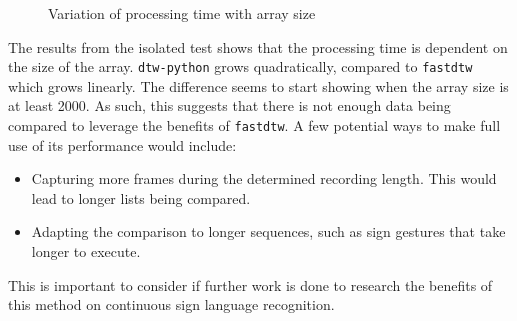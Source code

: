 \documentclass[final,rdr32.tex]{subfiles}
\begin{document}
\begin{figure}[H]
    \begin{center}
    \end{center}
    \caption{Variation of processing time with array size}
    \label{line:performance}
\end{figure}


The results from the isolated test shows that the processing time is dependent on the size of the array. \verb|dtw-python| grows quadratically, compared to \verb|fastdtw| which grows linearly. The difference seems to start showing when the array size is at least 2000. As such, this suggests that there is not enough data being compared to leverage the benefits of \verb|fastdtw|. A few potential ways to make full use of its performance would include:
\begin{itemize}
    \item Capturing more frames during the determined recording length. This would lead to longer lists being compared.
    \item Adapting the comparison to longer sequences, such as sign gestures that take longer to execute.
\end{itemize}

This is important to consider if further work is done to research the benefits of this method on continuous sign language recognition.
\end{document}
